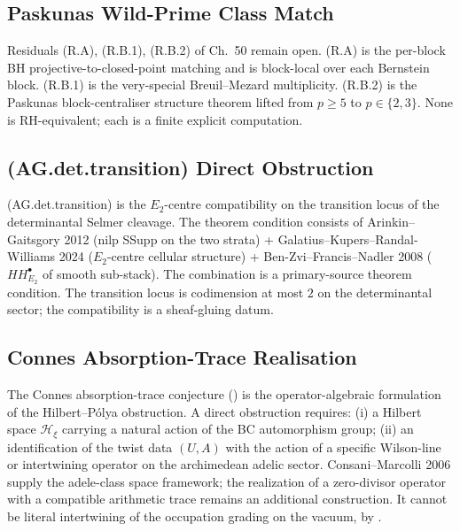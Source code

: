 \subsection{Paskunas Wild-Prime Class Match}
\label{v4-arith:w5-synth:paskunas-wild}

Residuals (R.A), (R.B.1), (R.B.2) of Ch.~50 remain open. (R.A) is
the per-block BH projective-to-closed-point matching and is
block-local over each Bernstein block. (R.B.1) is the
very-special Breuil--Mezard multiplicity. (R.B.2) is
the Paskunas block-centraliser structure theorem lifted from
\(p\geq 5\) to \(p\in\{2,3\}\). None is RH-equivalent;
each is a finite explicit computation.

\subsection{(AG.det.transition) Direct Obstruction}
\label{v4-arith:w5-synth:AG-det-transition}

(AG.det.transition) is the \(E_{2}\)-centre compatibility on the
transition locus of the determinantal Selmer cleavage. The theorem
condition consists of Arinkin--Gaitsgory 2012 (nilp SSupp on the two strata) +
Galatius--Kupers--Randal-Williams 2024 (\(E_{2}\)-centre cellular
structure) + Ben-Zvi--Francis--Nadler 2008 (\(HH^{\bullet}_{E_{2}}\)
of smooth sub-stack). The combination is a primary-source theorem
condition. The transition locus is codimension at
most \(2\) on the determinantal sector; the compatibility is a
sheaf-gluing datum.

\subsection{Connes Absorption-Trace Realisation}
\label{v4-arith:w5-synth:connes-absorption}

The Connes absorption-trace conjecture
() is the operator-algebraic
formulation of the Hilbert--P\'olya obstruction. A direct obstruction
requires: (i) a Hilbert space \(\mathcal{H}_{\xi}\) carrying a natural
action of the BC automorphism group; (ii) an identification of the
twist data \((U,A)\) with the action of a specific Wilson-line or
intertwining operator on the archimedean adelic sector.
Consani--Marcolli 2006 supply the adele-class space framework; the realization of a zero-divisor operator with a compatible arithmetic
trace remains an additional construction. It cannot be literal
intertwining of the occupation grading on the vacuum, by
.

